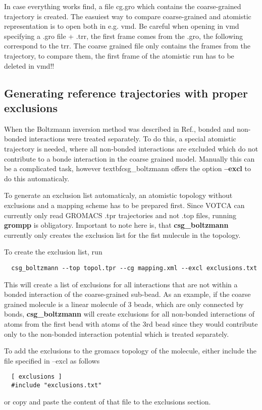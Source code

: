 In case everything works find, a file cg.gro which contains the coarse-grained trajectory is created. The easuiest way to compare coarse-grained and atomistic representation is to open both in e.g. vmd.  Be careful when opening in vmd specifying a .gro file + .trr, the first frame comes from the .gro, the following correspond to the trr. The coarse grained file only contains the frames from the trajectory, to compare them, the first frame of the atomistic run has to be deleted in vmd!!

\subsection{Generating reference trajectories with proper exclusions}
When the Boltzmann inversion method was described in Ref.\cite{Tschoep:1998}, bonded and non-bonded interactions were treated separately. To do this, a special atomistic trajectory is needed, where all non-bonded interactions are excluded which do not contribute to a bonde interaction in the coarse grained model. Manually this can be a complicated task, however textbf{csg\_boltzmann} offers the option \textbf{--excl} to do this automaticaly.

To generate an exclusion list automaticaly, an atomistic topology without exclusions and a mapping scheme has to be prepared first. Since VOTCA can currently only read GROMACS .tpr trajectories and not .top files, running \textbf{grompp} is obligatory. Important to note here is, that \textbf{csg\_boltzmann} currently only creates the exclusion list for the fist mulecule in the topology.

To create the exclusion list, run
\begin{verbatim}
  csg_boltzmann --top topol.tpr --cg mapping.xml --excl exclusions.txt
\end{verbatim}
This will create a list of exclusions for all interactions that are not within a bonded interaction of the coarse-grained sub-bead. As an example, if the coarse grained molecule is a linear molecule of 3 beads, which are only connected by bonds, \textbf{csg\_boltzmann} will create exclusions for all non-bonded interactions of atoms from the first bead with atoms of the 3rd bead since they would contribute only to the non-bonded interaction potential which is treated separately.

To add the exclusions to the gromacs topology of the molecule, either include the file specified in --excl as follows
\begin{verbatim}
  [ exclusions ]
  #include "exclusions.txt"
\end{verbatim}
or copy and paste the content of that file to the exclusions section.


